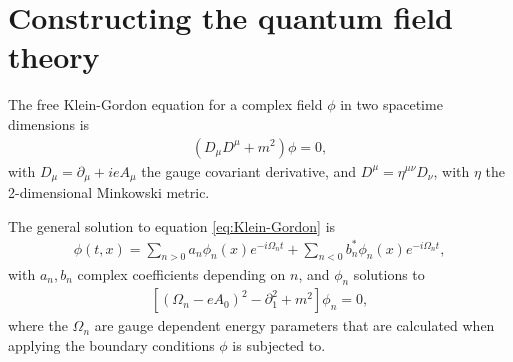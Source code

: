 %



%

\section{Constructing the quantum field theory}

The free Klein-Gordon equation for a complex field $\phi$ in two spacetime dimensions is
\begin{align}
	(D_\mu D^{\mu} + m^2)\phi = 0,
	\label{eq:Klein-Gordon}
\end{align}
with $D_\mu = \partial_\mu +i e A_\mu$ the gauge covariant derivative, and $D^\mu = \eta^{\mu\nu}D_\nu$, with $\eta$ the 2-dimensional Minkowski metric.

The general solution to equation \eqref{eq:Klein-Gordon} is 
\begin{align}
	\phi(t, x) = \sum_{n>0}^{} a_n \phi_n (x) e^{-i\Omega_n t}
+\sum_{n<0}^{} b^*_n \phi_n (x) e^{-i\Omega_n t},
\end{align}
with $a_n, b_n$ complex coefficients depending on $n $, and $\phi_n$ solutions to
\begin{align}
	\left[ \left( \Omega_n - eA_0 \right)^2 - \partial_1^2 + m^2  \right] \phi_n = 0,
\end{align}
where the $\Omega_n$ are gauge dependent energy parameters that are calculated when applying the boundary conditions $\phi$ is subjected to.

